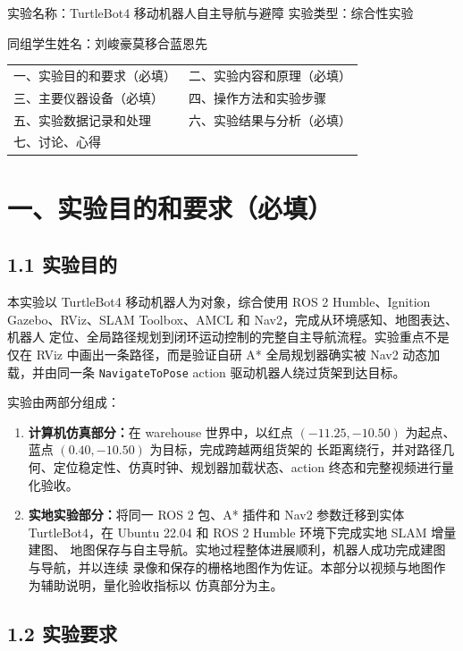 \documentclass[12pt,a4paper]{ctexart}
\begin{document}
\noindent 实验名称：TurtleBot4 移动机器人自主导航与避障
\hfill 实验类型：综合性实验

\noindent 同组学生姓名：刘峻豪\quad 莫移合\quad 蓝恩先

\vspace{0.35cm}
\begin{tabularx}{\textwidth}{X X}
  一、实验目的和要求（必填） & 二、实验内容和原理（必填）\\
  三、主要仪器设备（必填） & 四、操作方法和实验步骤\\
  五、实验数据记录和处理 & 六、实验结果与分析（必填）\\
  七、讨论、心得 & \\
\end{tabularx}

\section*{一、实验目的和要求（必填）}

\subsection*{1.1 实验目的}

本实验以 TurtleBot4 移动机器人为对象，综合使用 ROS 2 Humble、Ignition
Gazebo、RViz、SLAM Toolbox、AMCL 和 Nav2，完成从环境感知、地图表达、机器人
定位、全局路径规划到闭环运动控制的完整自主导航流程。实验重点不是仅在 RViz
中画出一条路径，而是验证自研 A* 全局规划器确实被 Nav2 动态加载，并由同一条
\texttt{NavigateToPose} action 驱动机器人绕过货架到达目标。

实验由两部分组成：
\begin{enumerate}[label=\arabic*)]
  \item \textbf{计算机仿真部分：}在 warehouse 世界中，以红点
  $(-11.25,-10.50)$ 为起点、蓝点 $(0.40,-10.50)$ 为目标，完成跨越两组货架的
  长距离绕行，并对路径几何、定位稳定性、仿真时钟、规划器加载状态、action
  终态和完整视频进行量化验收。
  \item \textbf{实地实验部分：}将同一 ROS 2 包、A* 插件和 Nav2 参数迁移到实体
  TurtleBot4，在 Ubuntu 22.04 和 ROS 2 Humble 环境下完成实地 SLAM 增量建图、
  地图保存与自主导航。实地过程整体进展顺利，机器人成功完成建图与导航，并以连续
  录像和保存的栅格地图作为佐证。本部分以视频与地图作为辅助说明，量化验收指标以
  仿真部分为主。
\end{enumerate}

\subsection*{1.2 实验要求}
\end{document}
